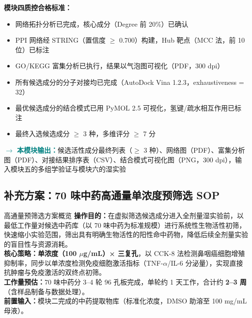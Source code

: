 \documentclass[12pt,a4paper,twoside]{article}
\newcommand{\moduleoutput}[1]{\par\vspace{6pt}\noindent\textcolor{teal}{\textbf{$\rightarrow$ 本模块输出：}}#1\vspace{6pt}}
\begin{document}
\begin{qcbox}
\textbf{模块四质控合格标准：}
\begin{itemize}
  \item 网络拓扑分析已完成，核心成分（Degree 前 20\%）已确认 
  \item PPI 网络经 STRING（置信度 $\geq$ 0.700）构建，Hub 靶点（MCC 法，前 10 位）已标注 
  \item GO/KEGG 富集分析已执行，结果以气泡图可视化（PDF，300 dpi）
  \item 所有候选成分的分子对接均已完成（AutoDock Vina 1.2.3，exhaustiveness = 32）
  \item 最优候选成分的结合模式已用 PyMOL 2.5 可视化，氢键/疏水相互作用已标注 
  \item 最终入选候选成分 $\geq$ 3 种，多维评分 $\geq$ 7 分 
\end{itemize}
\end{qcbox}

\moduleoutput{候选活性成分最终列表（$\geq$ 3 种）、网络图（PDF）、富集分析图（PDF）、对接结果排序表（CSV）、结合模式可视化图（PNG，300 dpi），输入模块五的多组学验证与模块六的湿实验}

\subsection{补充方案：70 味中药高通量单浓度预筛选 SOP}
\label{sec:module4_hts}

\begin{infobox}{高通量预筛选方案概览}
\textbf{操作目的：}在虚拟筛选候选成分进入全剂量湿实验前，以最低工作量对候选中药库（以 70 味中药为标准规模）进行系统性生物活性初筛，快速缩小实验范围，筛出具有明确生物活性的阳性命中药物，降低后续全剂量实验的盲目性与资源消耗。\\
\textbf{核心策略：}\textbf{单浓度（100 $\mu$g/mL）× 三复孔}，以 CCK-8 法检测鼻咽癌细胞增殖抑制率，同步以单浓度检测免疫细胞激活指标（TNF-$\alpha$/IL-6 分泌量），实现直接抗肿瘤与免疫激活的双终点初筛。\\
\textbf{工作量预估：}70 味中药分 3--4 轮 96 孔板完成，单轮约 1 天工作，合计约 \textbf{2--3 周}（含样品制备与数据处理）。\\
\textbf{前置输入：}模块二完成的中药提取物库（标准化浓度，DMSO 助溶至 100 mg/mL 母液）。
\end{infobox}
\end{document}
